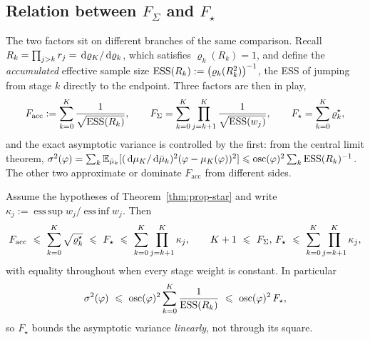 \documentclass{article}
\begin{document}
{\color{red}
\subsection*{Relation between $F_\Sigma$ and $F_\star$}

The two factors sit on different branches of the same comparison. Recall $R_k=\prod_{j>k}r_j=\,\mathrm d\varrho_K/\,\mathrm d\varrho_k$, which satisfies $\varrho_k(R_k)=1$, and define the \emph{accumulated} effective sample size $\mathrm{ESS}(R_k):=\bigl(\varrho_k(R_k^2)\bigr)^{-1}$, the ESS of jumping from stage $k$ directly to the endpoint. Three factors are then in play,
\begin{equation*}
    F_{\mathrm{acc}}:=\sum_{k=0}^{K}\frac{1}{\sqrt{\mathrm{ESS}(R_k)}},
    \qquad
    F_\Sigma=\sum_{k=0}^{K}\prod_{j=k+1}^{K}\frac{1}{\sqrt{\mathrm{ESS}(w_j)}},
    \qquad
    F_\star=\sum_{k=0}^{K}\varrho^\star_k ,
\end{equation*}
and the exact asymptotic variance is controlled by the first: from the central limit theorem, $\sigma^2(\varphi)=\sum_k\mathbb E_{\bar\mu_k}[(\,\mathrm d\mu_K/\,\mathrm d\bar\mu_k)^2(\varphi-\mu_K(\varphi))^2]\leqslant\operatorname{osc}(\varphi)^2\sum_k\mathrm{ESS}(R_k)^{-1}$. The other two approximate or dominate $F_{\mathrm{acc}}$ from different sides.

\begin{lemma}[Ordering]
\label{lem:factor-order}
Assume the hypotheses of Theorem~\ref{thm:prop-star} and write $\kappa_j:=\operatorname{ess\,sup}w_j/\operatorname{ess\,inf}w_j$. Then
\begin{equation*}
    F_{\mathrm{acc}}\ \Le\ \sum_{k=0}^{K}\sqrt{\varrho^\star_k}\ \Le\ F_\star\ \Le\ \sum_{k=0}^{K}\prod_{j=k+1}^{K}\kappa_j ,
    \qquad
    K+1\ \Le\ F_\Sigma,\,F_\star\ \Le\ \sum_{k=0}^{K}\prod_{j=k+1}^{K}\kappa_j ,
\end{equation*}
with equality throughout when every stage weight is constant. In particular
\begin{equation*}
    \sigma^2(\varphi)\ \Le\ \osc(\varphi)^2\sum_{k=0}^{K}\frac{1}{\ESS(R_k)}\ \Le\ \osc(\varphi)^2\,F_\star ,
\end{equation*}
so $F_\star$ bounds the asymptotic variance \emph{linearly}, not through its square.
\end{lemma}

}
\end{document}

